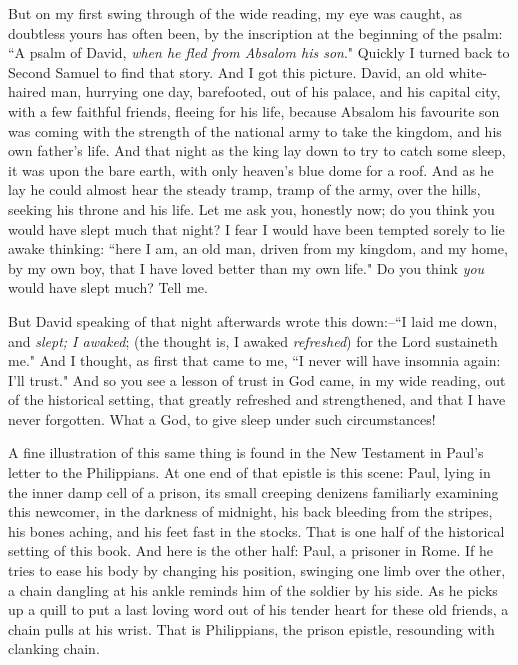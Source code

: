 But on my first swing through of the wide reading, my eye was caught, as
doubtless yours has often been, by the inscription at the beginning of the
psalm: ``A psalm of David, \textit{when he fled from Absalom his son}." Quickly I
turned back to Second Samuel to find that story. And I got this picture.
David, an old white-haired man, hurrying one day, barefooted, out of his
palace, and his capital city, with a few faithful friends, fleeing for his
life, because Absalom his favourite son was coming with the strength of
the national army to take the kingdom, and his own father's life. And that
night as the king lay down to try to catch some sleep, it was upon the
bare earth, with only heaven's blue dome for a roof. And as he lay he
could almost hear the steady tramp, tramp of the army, over the hills,
seeking his throne and his life. Let me ask you, honestly now; do you
think you would have slept much that night? I fear I would have been
tempted sorely to lie awake thinking: ``here I am, an old man, driven from
my kingdom, and my home, by my own boy, that I have loved better than my
own life." Do you think \textit{you} would have slept much? Tell me.

But David speaking of that night afterwards wrote this down:--``I laid me
down, and \textit{slept; I awaked}; (the thought is, I awaked \textit{refreshed}) for
the Lord sustaineth me." And I thought, as first that came to me, ``I never
will have insomnia again: I'll trust." And so you see a lesson of trust in
God came, in my wide reading, out of the historical setting, that greatly
refreshed and strengthened, and that I have never forgotten. What a God,
to give sleep under such circumstances!

A fine illustration of this same thing is found in the New Testament in
Paul's letter to the Philippians. At one end of that epistle is this
scene: Paul, lying in the inner damp cell of a prison, its small creeping
denizens familiarly examining this newcomer, in the darkness of midnight,
his back bleeding from the stripes, his bones aching, and his feet fast in
the stocks. That is one half of the historical setting of this book. And
here is the other half: Paul, a prisoner in Rome. If he tries to ease his
body by changing his position, swinging one limb over the other, a chain
dangling at his ankle reminds him of the soldier by his side. As he picks
up a quill to put a last loving word out of his tender heart for these old
friends, a chain pulls at his wrist. That is Philippians, the prison
epistle, resounding with clanking chain.

